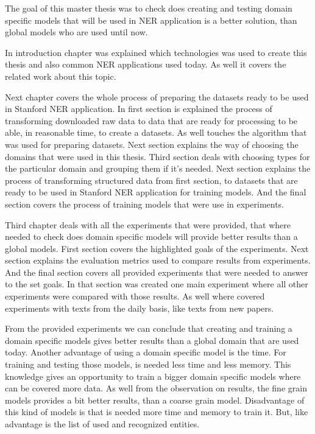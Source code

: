 \documentclass[thesis=M,english]{FITthesis}[2018/05/30]
\begin{document}
\begin{conclusion}
	The goal of this master thesis was to check does creating and testing domain specific models that will be used in NER application is a better solution, than global models who are used until now.
	
	In introduction chapter was explained which technologies was used to create this thesis and also common NER applications used today. As well it covers the related work about this topic.
	
	Next chapter covers the whole process of preparing the datasets ready to be used in Stanford NER application. In first section is explained the process of transforming downloaded raw data to data that are ready for processing to be able, in reasonable time, to create a datasets. As well touches the algorithm that was used for preparing datasets. Next section explains the way of choosing the domains that were used in this thesis. Third section deals with choosing types for the particular domain and grouping them if it's needed. Next section explains the process of transforming structured data from first section, to datasets that are ready to be used in Stanford NER application for training models. And the final section covers the process of training models that were use in experiments.
	
	Third chapter deals with all the experiments that were provided, that where needed to check does domain specific models will provide better results than a global models. First section covers the highlighted goals of the experiments. Next section explains the evaluation metrics used to compare results from experiments. And the final section covers all provided experiments that were needed to answer to the set goals. In that section was created one main experiment where all other experiments were compared with those results. As well where covered experiments with texts from the daily basis, like texts from new papers.
	
	From the provided experiments we can conclude that creating and training a domain specific models gives better results than a global domain that are used today. Another advantage of using a domain specific model is the time. For training and testing those models, is needed less time and less memory. This knowledge gives an opportunity to train a bigger domain specific models where can be covered more data. As well from the observation on results, the fine grain models provides a bit better results, than a coarse grain model. Disadvantage of this kind of models is that is needed more time and memory to train it. But, like advantage is the list of used and recognized entities.
	

\end{conclusion}
\end{document}
